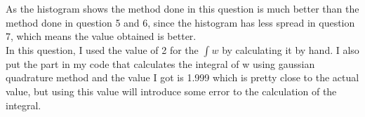 \documentclass[letterpaper,12pt]{article}
\begin{document}
As the histogram shows the method done in this question is much better than the method done in question 5 and 6, since the histogram has less spread in question 7, which means the value obtained is better.
\\In this question, I used the value of 2 for the $\int w$ by calculating it by hand. I also put the part in my code that calculates the integral of w using gaussian quadrature method and the value I got is 1.999 which is pretty close to the actual value, but using this value will introduce some error to the calculation of the integral.
\end{document}
